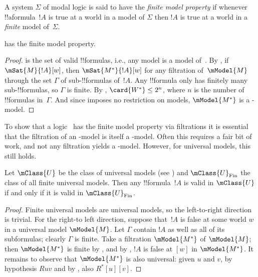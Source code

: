 \documentclass[../../../include/open-logic-section]{subfiles}
\begin{document}

\begin{defn}
  A system $\Sigma$ of modal logic is said to have the \emph{finite
    model property} if whenever !!a{formula}~$!A$ is true at a world
  in a model of $\Sigma$ then $!A$ is true at a world in a
  \emph{finite} model of~$\Sigma$.
\end{defn}

\begin{prop}
   has the finite model property.
\end{prop}

\begin{proof}
   is the set of valid !!{formula}s, i.e., any model is a model
  of~.  By , if
  $\mSat{M}{!A}[w]$, then $\mSat{M^*}{!A}[w]$ for any filtration
  of~$\mModel{M}$ through the set $\Gamma$ of sub-!!{formula}s
  of~$!A$. Any !!{formula} only has finitely many sub-!!{formula}s, so
  $\Gamma$ is finite. By ,
  $\card{W^*} \le 2^n$, where $n$ is the number of !!{formula}s
  in~$\Gamma$. And since  imposes no restriction on models,
  $\mModel{M^*}$ is a -model.
\end{proof}

To show that a logic~ has the finite model property via
filtrations it is essential that the filtration of an -model is
itself a -model. Often this requires a fair bit of work, and
not any filtration yields a -model. However, for universal
models, this still holds.

\begin{prop}
  Let $\mClass{U}$ be the class of universal models (see
  ) and $\mClass{U}_\mathrm{Fin}$ the
  class of all finite universal models. Then any !!{formula}~$!A$ is
  valid in $\mClass{U}$ if and only if it is valid in
  $\mClass{U}_\mathrm{Fin}$.
\end{prop}

\begin{proof}
  Finite universal models are universal models, so the left-to-right
  direction is trivial. For the right-to left direction, suppose
  that~$!A$ is false at some world $w$ in a universal model
  $\mModel{M}$. Let $\Gamma$ contain $!A$ as well as all of its
  subformulas; clearly $\Gamma$ is finite. Take a filtration
  $\mModel{M^*}$ of $\mModel{M}$; then $\mModel{M^*}$ is finite by
  , and by
  , $!A$ is false at $[w]$ in
  $\mModel{M^*}$. It remains to observe that $\mModel{M^*}$ is also
  universal: given $u$ and $v$, by hypothesis $Ruv$ and by
  ,
  also $R^*[u][v]$.
\end{proof}
\end{document}

